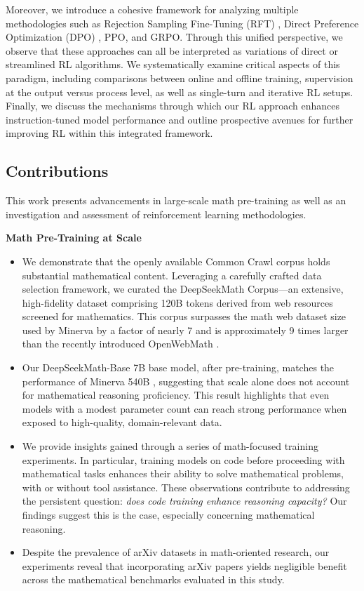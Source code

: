 Moreover, we introduce a cohesive framework for analyzing multiple methodologies such as Rejection Sampling Fine-Tuning (RFT) \citep{yuan2023scaling}, Direct Preference Optimization (DPO) \citep{dpo}, PPO, and GRPO. Through this unified perspective, we observe that these approaches can all be interpreted as variations of direct or streamlined RL algorithms. We systematically examine critical aspects of this paradigm, including comparisons between online and offline training, supervision at the output versus process level, as well as single-turn and iterative RL setups. Finally, we discuss the mechanisms through which our RL approach enhances instruction-tuned model performance and outline prospective avenues for further improving RL within this integrated framework.

\subsection{Contributions}
This work presents advancements in large-scale math pre-training as well as an investigation and assessment of reinforcement learning methodologies.

\textbf{Math Pre-Training at Scale}

\begin{itemize}[topsep=0pt]
    \item We demonstrate that the openly available Common Crawl corpus holds substantial mathematical content. Leveraging a carefully crafted data selection framework, we curated the DeepSeekMath Corpus—an extensive, high-fidelity dataset comprising 120B tokens derived from web resources screened for mathematics. This corpus surpasses the math web dataset size used by Minerva \citep{minerva} by a factor of nearly 7 and is approximately 9 times larger than the recently introduced OpenWebMath \citep{openwebmath}.

    \item Our DeepSeekMath-Base 7B base model, after pre-training, matches the performance of Minerva 540B \citep{minerva}, suggesting that scale alone does not account for mathematical reasoning proficiency. This result highlights that even models with a modest parameter count can reach strong performance when exposed to high-quality, domain-relevant data.

    \item We provide insights gained through a series of math-focused training experiments. In particular, training models on code before proceeding with mathematical tasks enhances their ability to solve mathematical problems, with or without tool assistance. These observations contribute to addressing the persistent question: \textit{does code training enhance reasoning capacity?} Our findings suggest this is the case, especially concerning mathematical reasoning.

    \item Despite the prevalence of arXiv datasets in math-oriented research, our experiments reveal that incorporating arXiv papers yields negligible benefit across the mathematical benchmarks evaluated in this study.
\end{itemize}

